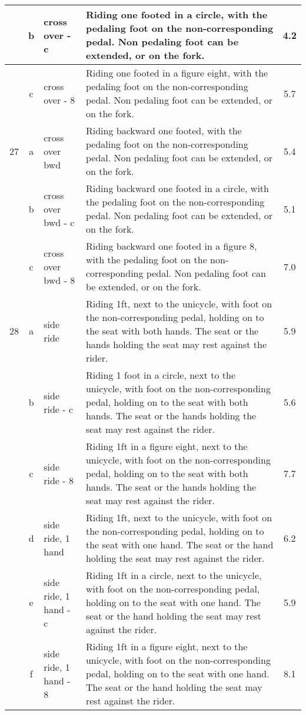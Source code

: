 \begin{longtable}{|r|c|p{4cm}|p{8cm}|c|}
\hline
  & b & cross over - c  & Riding one footed in a circle, with the pedaling foot on the non-corresponding pedal. Non pedaling foot can be extended, or on the fork.  & 4.2 \\ 
\hline
  & c & cross over - 8  & Riding one footed in a figure eight, with the pedaling foot on the non-corresponding pedal. Non pedaling foot can be extended, or on the fork.  & 5.7 \\ 
\hline
27  & a & cross over bwd  & Riding backward one footed, with the pedaling foot on the non-corresponding pedal. Non pedaling foot can be extended, or on the fork. & 5.4 \\ 
\hline
  & b & cross over bwd - c  & Riding backward one footed in a circle, with the pedaling foot on the non-corresponding pedal. Non pedaling foot can be extended, or on the fork. & 5.1 \\ 
\hline
  & c & cross over bwd - 8  & Riding backward one footed in a figure 8, with the pedaling foot on the non-corresponding pedal. Non pedaling foot can be extended, or on the fork. & 7.0 \\ 
\hline
28  & a & side ride & Riding 1ft, next to the unicycle, with foot on the non-corresponding pedal, holding on to the seat with both hands. The seat or the hands holding the seat may rest against the rider.  & 5.9 \\ 
\hline
  & b & side ride - c & Riding 1 foot in a circle, next to the unicycle, with foot on the non-corresponding pedal, holding on to the seat with both hands. The seat or the hands holding the seat may rest against the rider. & 5.6 \\ 
\hline
  & c & side ride - 8 & Riding 1ft in a figure eight, next to the unicycle, with foot on the non-corresponding pedal, holding on to the seat with both hands. The seat or the hands holding the seat may rest against the rider.  & 7.7 \\ 
\hline
  & d & side ride, 1 hand & Riding 1ft, next to the unicycle, with foot on the non-corresponding pedal, holding on to the seat with one hand. The seat or the hand holding the seat may rest against the rider. & 6.2 \\ 
\hline
  & e & side ride, 1 hand - c & Riding 1ft in a circle, next to the unicycle, with foot on the non-corresponding pedal, holding on to the seat with one hand. The seat or the hand holding the seat may rest against the rider. & 5.9 \\ 
\hline
  & f & side ride, 1 hand - 8 & Riding 1ft in a figure eight, next to the unicycle, with foot on the non-corresponding pedal, holding on to the seat with one hand. The seat or the hand holding the seat may rest against the rider. & 8.1 \\ 

\end{longtable}
